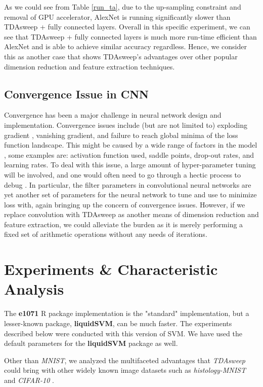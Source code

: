 \documentclass{article}
\begin{document}
As we could see from Table \ref{run_ta}, due to the up-sampling constraint and removal of GPU accelerator, AlexNet is running significantly slower than TDAsweep + fully connected layers. Overall in this specific experiment, we can see that TDAsweep + fully connected layers is much more run-time efficient than AlexNet and is able to achieve similar accuracy regardless. Hence, we consider this as another case that shows TDAsweep's advantages over other popular dimension reduction and feature extraction techniques.

\subsection{Convergence Issue in CNN}

Convergence has been a major challenge in neural network design and implementation. Convergence issues include (but are not limited to) exploding gradient \cite{philipp_song_carbonell_2018}, vanishing gradient, and failure to reach global minima of the loss function landscape. This might be caused by a wide range of factors in the model \cite{Pascanu2014}, some examples are: activation function used, saddle points, drop-out rates, and learning rates. To deal with this issue, a large amount of hyper-parameter tuning will be involved, and one would often need to go through a hectic process to debug \cite{fortelny_bock_2019}. In particular, the filter parameters in convolutional neural networks are yet another set of parameters for the neural network to tune and use to minimize loss with, again bringing up the concern of convergence issues. However, if we replace convolution with TDAsweep as another means of dimension reduction and feature extraction, we could alleviate the burden as it is merely performing a fixed set of arithmetic operations without any needs of iterations. 


\section{Experiments \& Characteristic Analysis}
The \textbf{e1071} R package implementation is the "standard" implementation, but a lesser-known package, \textbf{liquidSVM}, can be much faster. The experiments described below were conducted with this version of SVM. We have used the default parameters for the \textbf{liquidSVM} package as well.

Other than \emph{MNIST}, we analyzed the multifaceted advantages that \emph{TDAsweep} could bring with other widely known image datasets such as \emph{histology-MNIST} \cite{kather_weis_bianconi_melchers_schad_gaiser_marx_zöllner_2016} and \emph{CIFAR-10} \cite{Krizhevsky09learningmultiple}.
\end{document}

